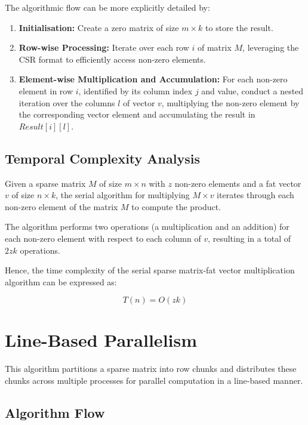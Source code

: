 \documentclass[12pt,oneside]{book} %
\begin{document}
The algorithmic flow can be more explicitly detailed by:
\begin{enumerate}
    \item \textbf{Initialisation:} Create a zero matrix of size \( m \times k \) to store the result.
    \item \textbf{Row-wise Processing:} Iterate over each row \(i\) of matrix \(M\), leveraging the CSR format to efficiently access non-zero elements.
    \item \textbf{Element-wise Multiplication and Accumulation:} For each non-zero element in row \(i\), identified by its column index \(j\) and value, conduct a nested iteration over the columns \(l\) of vector \(v\), multiplying the non-zero element by the corresponding vector element and accumulating the result in \(Result[i][l]\).
\end{enumerate}

\subsection{Temporal Complexity Analysis}

Given a sparse matrix $M$ of size $m \times n$ with $z$ non-zero elements and a
fat vector $v$ of size $n \times k$, the serial algorithm for multiplying \(M
\times v\) iterates through each non-zero element of the matrix \(M\) to
compute the product.

The algorithm performs two operations (a multiplication and an addition) for
each non-zero element with respect to each column of \(v\), resulting in a
total of \(2zk\) operations.

Hence, the time complexity of the serial sparse matrix-fat vector
multiplication algorithm can be expressed as:

\begin{equation}
    T(n) = O(zk)
\end{equation}

\section{Line-Based Parallelism}
This algorithm partitions a sparse matrix into row chunks and distributes these
chunks across multiple processes for parallel computation in a line-based
manner.

\subsection{Algorithm Flow}
\end{document}
